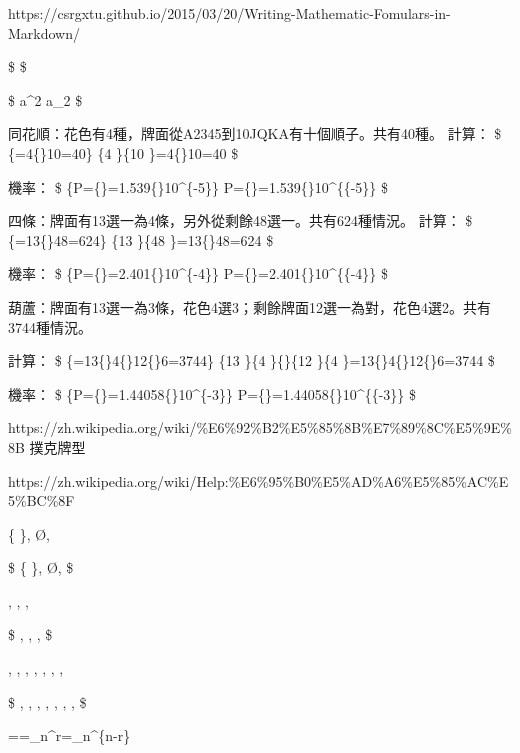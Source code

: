 \documentclass[11pt]{article}
\begin{document}
https://csrgxtu.github.io/2015/03/20/Writing-Mathematic-Fomulars-in-Markdown/

\$ \alpha \beta \gamma \delta \$

\$ a\^{}2 a\_2 \$

同花順：花色有4種，牌面從A2345到10JQKA有十個順子。共有40種。 計算： \$
\{=4\{\times \}10=40\} \{4
\}\{10 \}=4\{\times \}10=40 \$

機率： \$
\{\displaystyle P=\{\}=1.539\{\times \}10\^{}\{-5\}\}
P=\{\}=1.539\{\times \}10\^{}\{\{-5\}\} \$

四條：牌面有13選一為4條，另外從剩餘48選一。共有624種情況。 計算： \$
\{=13\{\times \}48=624\} \{13
\}\{48 \}=13\{\times \}48=624 \$

機率： \$
\{\displaystyle P=\{\}=2.401\{\times \}10\^{}\{-4\}\}
P=\{\}=2.401\{\times \}10\^{}\{\{-4\}\} \$

葫蘆：牌面有13選一為3條，花色4選3；剩餘牌面12選一為對，花色4選2。共有3744種情況。

計算： \$
\{=13\{\times \}4\{\times \}12\{\times \}6=3744\}
\{13 \}\{4 \}\{\times \}\{12 \}\{4
\}=13\{\times \}4\{\times \}12\{\times \}6=3744 \$

機率： \$
\{\displaystyle P=\{\}=1.44058\{\times \}10\^{}\{-3\}\}
P=\{\}=1.44058\{\times \}10\^{}\{\{-3\}\} \$

    https://zh.wikipedia.org/wiki/\%E6\%92\%B2\%E5\%85\%8B\%E7\%89\%8C\%E5\%9E\%8B
撲克牌型

    https://zh.wikipedia.org/wiki/Help:\%E6\%95\%B0\%E5\%AD\%A6\%E5\%85\%AC\%E5\%BC\%8F

\{ \}, \O \empty \emptyset, \varnothing 

\$ \{ \}, \O \empty \emptyset, \varnothing \$

\in, \notin \not\in, \ni, \not\ni

\$ \in, \notin \not\in, \ni, \not\ni \$

    \diamondsuit, \heartsuit, \clubsuit, \spadesuit, \Game, \flat, \natural,
\sharp

\$ \diamondsuit, \heartsuit, \clubsuit, \spadesuit, \Game, \flat,
\natural, \sharp
\$

==\_n\^{}r=\_n\^{}\{n-r\}
\end{document}
